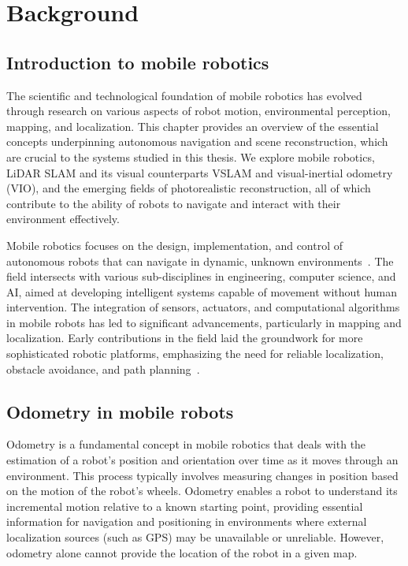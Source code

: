 \chapter{Background} \label{background}

\section{Introduction to mobile robotics}
The scientific and technological foundation of mobile robotics has evolved through research on various aspects of robot motion, environmental perception, mapping, and localization. This chapter provides an overview of the essential concepts underpinning autonomous navigation and scene reconstruction, which are crucial to the systems studied in this thesis. We explore mobile robotics, LiDAR SLAM and its visual counterparts VSLAM and visual-inertial odometry (VIO), and the emerging fields of photorealistic reconstruction, all of which contribute to the ability of robots to navigate and interact with their environment effectively.


Mobile robotics focuses on the design, implementation, and control of autonomous robots that can navigate in dynamic, unknown environments~\cite{probabilistic_robotics}. The field intersects with various sub-disciplines in engineering, computer science, and AI, aimed at developing intelligent systems capable of movement without human intervention. The integration of sensors, actuators, and computational algorithms in mobile robots has led to significant advancements, particularly in mapping and localization. Early contributions in the field laid the groundwork for more sophisticated robotic platforms, emphasizing the need for reliable localization, obstacle avoidance, and path planning~\cite{introduction_to_autonomous_mobile_robots}.

\section{Odometry in mobile robots}

Odometry is a fundamental concept in mobile robotics that deals with the estimation of a robot's position and orientation over time as it moves through an environment. This process typically involves measuring changes in position based on the motion of the robot’s wheels. Odometry enables a robot to understand its incremental motion relative to a known starting point, providing essential information for navigation and positioning in environments where external localization sources (such as GPS) may be unavailable or unreliable. However, odometry alone cannot provide the location of the robot in a given map.

